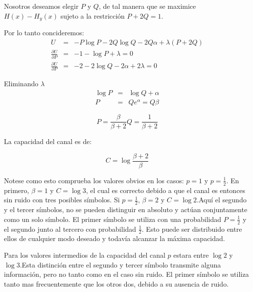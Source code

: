 \documentclass{article}
\begin{document}
Nosotros deseamos elegir $P$ y $Q$, de tal manera que se maximice
$H(x) - H_y(x)$ sujeto a la restricci\'on $P + 2Q = 1$.

Por lo tanto concideremos:
\begin{equation}
\begin{array}{rcl}
U &=& -P\log{P} - 2Q\log{Q} -2Q\alpha + \lambda(P+2Q) \\
\frac{{\partial U}}{{\partial P}} &=& -1 - \log{P} + \lambda = 0 \\
\frac{{\partial U}}{{\partial P}} &=& -2 - 2\log{Q} -2\alpha + 2\lambda = 0
\end{array}
\end{equation}

Eliminando $\lambda$
\begin{equation}
\begin{array}{rcl}
\log{P} &=& \log{Q} + \alpha \\
P &=& Q e^\alpha = Q\beta 
\end{array}
\end{equation}

\begin{equation}
  P = \frac{\beta}{\beta + 2}   Q = \frac{1}{\beta + 2}
\end{equation}

La capacidad del canal es de:

\begin{equation}
  C = \log{\frac{\beta + 2}{\beta}}
\end{equation}

Notese como esto comprueba los valores obvios en los casos: $p = 1$ y $p = \frac{1}{2}$. En primero, $\beta = 1$ y $C = \log{3}$, 
el cual es correcto debido a que el canal es entonces sin ruido con tres posibles s\'imbolos. Si $p = \frac{1}{2}$, $\beta = 2$ y 
$C = \log{2}$.Aqu\'i el segundo y el tercer s\'imbolos, no se pueden distinguir en absoluto y act\'uan conjuntamente como un solo 
s\'imbolo. El primer s\'imbolo se utiliza con una probabilidad $P = \frac{1}{2}$  y el segundo junto al tercero con probabilidad $\frac{1}{2}$.
Esto puede ser distribuido entre ellos de cualquier modo deseado y todav\'ia alcanzar la m\'axima capacidad.

Para los valores intermedios de la capacidad del canal $p$ estara entre $\log{2}$ y $\log{3}$.Esta distinci\'on 
entre el segundo y tercer s\'imbolo transmite alguna informaci\'on, pero no tanto como en el caso sin ruido.
El primer s\'imbolo se utiliza tanto mas frecuentemente que los otros dos, debido a su ausencia de ruido.
\end{document}
